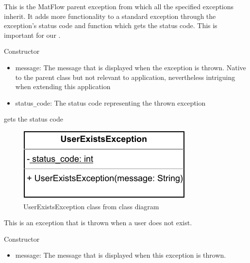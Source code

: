 This is the MatFlow parent exception from which all the specified exceptions inherit. It adds more functionality to 
a standard exception through the exception's status code and function which gets the status code. This is important for our
.
\begin{methodenv}{Constructor}
\begin{itemize}
	\item{message:}
	The message that is displayed when the exception is thrown. Native to the parent class but not relevant to application,
    nevertheless intriguing when extending this application 
    \item{status\texttt{\_}code:}
	The status code representing the thrown exception
\end{itemize}

gets the status code

\end{methodenv}



\begin{figure}[H]
        \centerline{\includegraphics[scale=1]{res/Klassen/UserExistsException.pdf}}
        \caption{UserExistsException class from class diagram}
\end{figure}

This is an exception that is thrown when a user does not exist.
\begin{methodenv}{Constructor}

\begin{itemize}
    \item{message:}
    The message that is displayed when this exception is thrown.
\end{itemize}

\end{methodenv}


